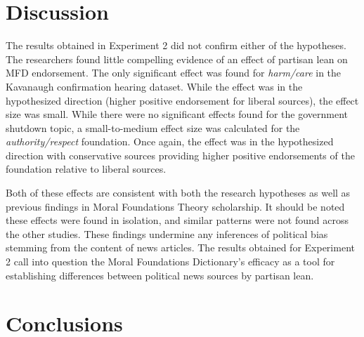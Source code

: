 \documentclass[english,,man]{apa6}
\begin{document}
\hypertarget{discussion-1}{%
\section{Discussion}\label{discussion-1}}

The results obtained in Experiment 2 did not confirm either of the hypotheses. The researchers found little compelling evidence of an effect of partisan lean on MFD endorsement. The only significant effect was found for \emph{harm/care} in the Kavanaugh confirmation hearing dataset. While the effect was in the hypothesized direction (higher positive endorsement for liberal sources), the effect size was small. While there were no significant effects found for the government shutdown topic, a small-to-medium effect size was calculated for the \emph{authority/respect} foundation. Once again, the effect was in the hypothesized direction with conservative sources providing higher positive endorsements of the foundation relative to liberal sources.

Both of these effects are consistent with both the research hypotheses as well as previous findings in Moral Foundations Theory scholarship. It should be noted these effects were found in isolation, and similar patterns were not found across the other studies. These findings undermine any inferences of political bias stemming from the content of news articles. The results obtained for Experiment 2 call into question the Moral Foundations Dictionary's efficacy as a tool for establishing differences between political news sources by partisan lean.

\hypertarget{conclusions}{%
\section{Conclusions}\label{conclusions}}
\end{document}
